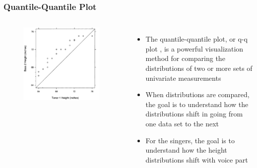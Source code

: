 \documentclass[aspectratio=1610]{beamer}
\begin{document}
\begin{frame}
	\frametitle{Quantile-Quantile Plot}
	\begin{columns}
		\begin{figure}
			\begin{center}
				\includegraphics[width=0.95\textwidth]{figures/quantile_quantile_plot.png}
			\end{center}
		\end{figure}
		\begin{itemize}
			\item The quantile-quantile plot, or q-q plot
			      \parencite{wilk1968probability}, is a powerful
			      visualization method for comparing the distributions of two or more sets
			      of univariate measurements
			\item When distributions are compared, the goal is to understand how the
			      distributions shift in going from one data set to the next
			\item For the singers, the goal is to understand how the height
			      distributions shift with voice part
		\end{itemize}
	\end{columns}
\end{frame}
\end{document}
